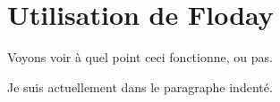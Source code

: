 \section{Utilisation de Floday}

Voyons voir à quel point ceci fonctionne, ou pas.

Je suis actuellement dans le paragraphe indenté.

